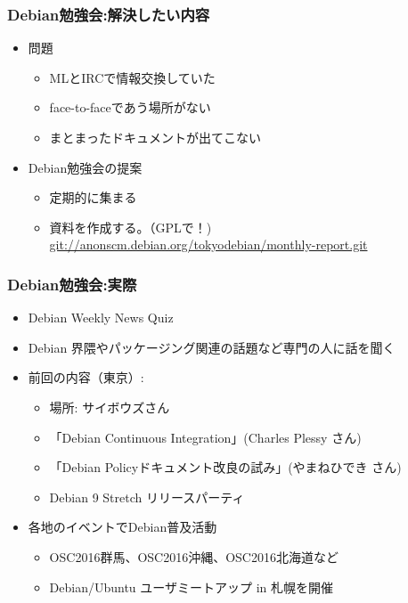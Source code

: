 \begin{frame}

\frametitle{Debian勉強会:解決したい内容}
\begin{itemize}
 \item<1-> 問題
       \begin{itemize}
	\item MLとIRCで情報交換していた
	\item face-to-faceであう場所がない
	\item まとまったドキュメントが出てこない
       \end{itemize}
 \item<2-> Debian勉強会の提案
       \begin{itemize}
	\item 定期的に集まる
	\item 資料を作成する。（GPLで！) \\
	  {\small \url{git://anonscm.debian.org/tokyodebian/monthly-report.git}}
       \end{itemize}
\end{itemize}

\end{frame}

\begin{frame}
 \frametitle{Debian勉強会:実際}
 \begin{itemize}
  \item Debian Weekly News Quiz
  \item Debian 界隈やパッケージング関連の話題など専門の人に話を聞く
  \item 前回の内容（東京）:\\
	\begin{itemize}
	\item 場所: サイボウズさん
    \item 「Debian Continuous Integration」(Charles Plessy さん)
    \item 「Debian Policyドキュメント改良の試み」(やまねひでき さん)
	\item Debian 9 Stretch リリースパーティ
	\end{itemize}
  \item 各地のイベントでDebian普及活動
	\begin{itemize}
	  \item OSC2016群馬、OSC2016沖縄、OSC2016北海道など
	  \item Debian/Ubuntu ユーザミートアップ in 札幌を開催
	\end{itemize}
 \end{itemize}
\end{frame}

